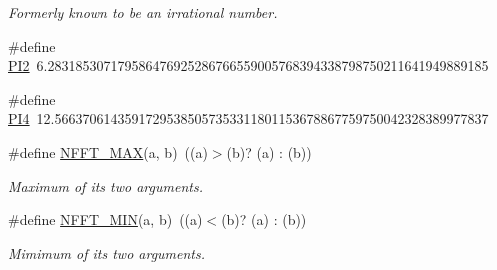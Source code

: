 \begin{CompactItemize}
\begin{CompactList}\small\item\em Formerly known to be an irrational number. \item\end{CompactList}\item 
\hypertarget{group__nfftutil_g2750dfdda752269a036f487a4a34b849}{
\#define \hyperlink{group__nfftutil_g2750dfdda752269a036f487a4a34b849}{PI2}~6.283185307179586476925286766559005768394338798750211641949889185}
\label{group__nfftutil_g2750dfdda752269a036f487a4a34b849}

\item 
\hypertarget{group__nfftutil_gfd17621e12029ff7c53518b74a487c94}{
\#define \hyperlink{group__nfftutil_gfd17621e12029ff7c53518b74a487c94}{PI4}~12.56637061435917295385057353311801153678867759750042328389977837}
\label{group__nfftutil_gfd17621e12029ff7c53518b74a487c94}

\item 
\hypertarget{group__nfftutil_gd2e3f0e1983de6d70f003545cc556ed3}{
\#define \hyperlink{group__nfftutil_gd2e3f0e1983de6d70f003545cc556ed3}{NFFT\_\-MAX}(a, b)~((a)$>$(b)? (a) : (b))}
\label{group__nfftutil_gd2e3f0e1983de6d70f003545cc556ed3}

\begin{CompactList}\small\item\em Maximum of its two arguments. \item\end{CompactList}\item 
\hypertarget{group__nfftutil_g9087991411f723f26723b2b26dbf3308}{
\#define \hyperlink{group__nfftutil_g9087991411f723f26723b2b26dbf3308}{NFFT\_\-MIN}(a, b)~((a)$<$(b)? (a) : (b))}
\label{group__nfftutil_g9087991411f723f26723b2b26dbf3308}

\begin{CompactList}\small\item\em Mimimum of its two arguments. \item\end{CompactList}\end{CompactItemize}
